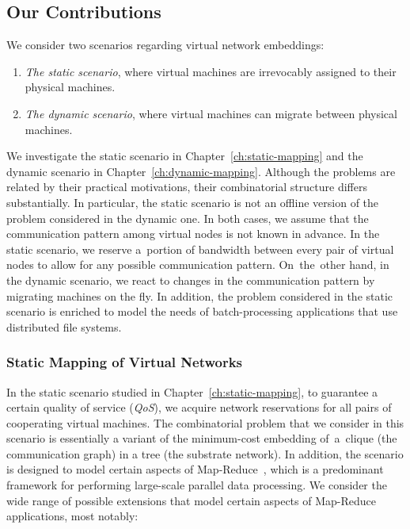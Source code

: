 \subsection{Our Contributions}

We consider two scenarios regarding virtual network embeddings:
\begin{enumerate}
  \item \emph{The static scenario}, where virtual machines are irrevocably assigned to their physical machines.
  \item \emph{The dynamic scenario}, where virtual machines can migrate between physical machines.
\end{enumerate}

We investigate the static scenario in Chapter~\ref{ch:static-mapping} and the dynamic scenario in Chapter~\ref{ch:dynamic-mapping}.
Although the problems are related by their practical motivations, their combinatorial structure differs substantially.
In particular, the static scenario is not an offline version of the problem considered in the dynamic one.
In both cases, we assume that the communication pattern among virtual nodes is not known in advance.
In the static scenario, we reserve a~portion of bandwidth between every pair of virtual nodes to allow for any possible communication pattern.
On~the~other hand, in the dynamic scenario, we react to changes in the communication pattern by migrating machines on the fly.
In addition, the problem considered in the static scenario is enriched to model the needs of batch-processing applications that use distributed file systems.


\subsubsection{Static Mapping of Virtual Networks}
\label{sec:contributions-static-mapping}

In the static scenario studied in Chapter~\ref{ch:static-mapping}, to guarantee a certain quality of service (\emph{QoS}), we acquire network reservations for all pairs of cooperating virtual machines.
The combinatorial problem that we consider in this scenario is essentially a variant of the minimum-cost embedding of~a~clique (the communication graph) in a tree (the substrate network).
In addition, the scenario is designed to model certain aspects of Map-Reduce~\cite{mapreduce}, which is a predominant framework for performing large-scale parallel data processing.
We consider the wide range of possible extensions that model certain aspects of Map-Reduce applications, most notably:

